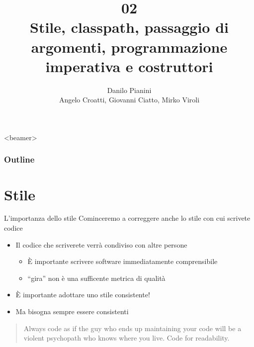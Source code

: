 \documentclass[presentation]{beamer}
\title[OOP02 -- Imperative]{02 \\ Stile, classpath, passaggio di argomenti, programmazione imperativa e costruttori}
\author[Pianini]{Danilo Pianini \\ Angelo Croatti, Giovanni Ciatto, Mirko Viroli}
\begin{document}
\frame[label=coverpage]{\titlepage}

\begin{frame}<beamer>
	\frametitle{Outline}
	\tableofcontents[]
\end{frame}


\section{Stile}

\begin{frame}{L'importanza dello stile}
	Cominceremo a correggere anche lo stile con cui scrivete codice
	\begin{itemize}
		\item Il codice che scriverete verrà condiviso con altre persone
		\begin{itemize}
			\item È importante scrivere software immediatamente comprensibile
			\item ``gira'' non è una sufficente metrica di qualità
		\end{itemize}
		\item È importante adottare uno stile consistente!
		\item Ma bisogna sempre essere consistenti
	\end{itemize}
	\vspace{1cm}
	\begin{quote}
		Always code as if the guy who ends up maintaining your code will be a violent psychopath who knows where you live. Code for readability.
	\end{quote}
\end{frame}
\end{document}
